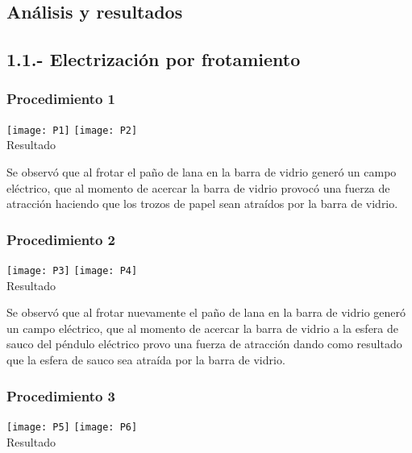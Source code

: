 \documentclass[10pt]{article}
\begin{document}
\begin{multicols}{2}
	\section{Análisis y resultados}
	\subsection*{1.1.- Electrización por frotamiento}
	\subsubsection*{Procedimiento 1}
	
	\begin{center}
		\texttt{[image: P1]}
		\texttt{[image: P2]}\\

		Resultado
	\end{center}

	Se observó que al frotar el paño de lana en la barra de vidrio generó un campo eléctrico, que al momento de acercar la barra de vidrio provocó una fuerza de atracción haciendo que los trozos de papel sean atraídos por la barra de vidrio.

	\subsubsection*{Procedimiento 2}

	\begin{center}
		\centering
		\texttt{[image: P3]}
		\texttt{[image: P4]}\\

		Resultado
	\end{center}

	Se observó que al frotar nuevamente el paño de lana en la barra de vidrio generó un campo eléctrico, que al momento de acercar la barra de vidrio a la esfera de sauco del péndulo eléctrico provo una fuerza de atracción dando como resultado que la esfera de sauco sea atraída por la barra de vidrio.
	\subsubsection*{Procedimiento 3}
	
	\begin{center}
		\texttt{[image: P5]}
		\texttt{[image: P6]}\\

		Resultado
	\end{center}


\end{multicols}
\end{document}
